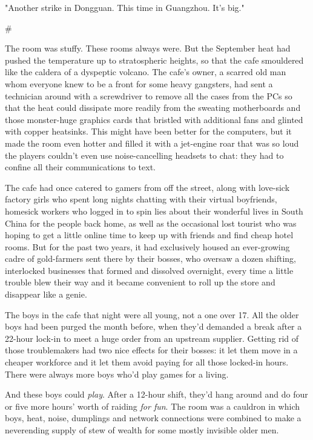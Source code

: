 "Another strike in Dongguan. This time in Guangzhou. It's big."

\#

The room was stuffy. These rooms always were. But the September
heat had pushed the temperature up to stratospheric heights, so
that the cafe smouldered like the caldera of a dyspeptic volcano.
The cafe's owner, a scarred old man whom everyone knew to be a
front for some heavy gangsters, had sent a technician around with a
screwdriver to remove all the cases from the PCs so that the heat
could dissipate more readily from the sweating motherboards and
those monster-huge graphics cards that bristled with additional
fans and glinted with copper heatsinks. This might have been better
for the computers, but it made the room even hotter and filled it
with a jet-engine roar that was so loud the players couldn't even
use noise-cancelling headsets to chat: they had to confine all
their communications to text.

The cafe had once catered to gamers from off the street, along with
love-sick factory girls who spent long nights chatting with their
virtual boyfriends, homesick workers who logged in to spin lies
about their wonderful lives in South China for the people back
home, as well as the occasional lost tourist who was hoping to get
a little online time to keep up with friends and find cheap hotel
rooms. But for the past two years, it had exclusively housed an
ever-growing cadre of gold-farmers sent there by their bosses, who
oversaw a dozen shifting, interlocked businesses that formed and
dissolved overnight, every time a little trouble blew their way and
it became convenient to roll up the store and disappear like a
genie.

The boys in the cafe that night were all young, not a one over 17.
All the older boys had been purged the month before, when they'd
demanded a break after a 22-hour lock-in to meet a huge order from
an upstream supplier. Getting rid of those troublemakers had two
nice effects for their bosses: it let them move in a cheaper
workforce and it let them avoid paying for all those locked-in
hours. There were always more boys who'd play games for a living.

And these boys could \emph{play}. After a 12-hour shift, they'd
hang around and do four or five more hours' worth of raiding
\emph{for fun}. The room was a cauldron in which boys, heat, noise,
dumplings and network connections were combined to make a
neverending supply of stew of wealth for some mostly invisible
older men.

